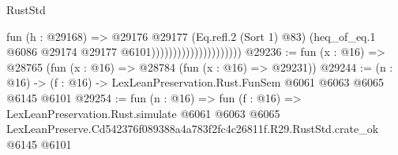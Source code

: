 \begin{lexlean}{RustStd}
\begin{coremodule}
                                          fun (h : @29168) =>
                                          @29176
                                            @29177
                                            (Eq.refl.{2} (Sort 1) @83)
                                            (heq_of_eq.{1}
                                              @6086
                                              @29174
                                              @29177
                                              @6101)))))))))))))))))))))
@29236 := fun (x : @16) => @28765 (fun (x : @16) => @28784 (fun (x : @16) => @29231))
@29244 := (n : @16) -> (f : @16) -> LexLeanPreservation.Rust.FunSem @6061 @6063 @6065 @6145 @6101
@29254 := fun (n : @16) =>
  fun (f : @16) =>
  LexLeanPreservation.Rust.simulate
    @6061
    @6063
    @6065
    LexLeanPreserve.Cd542376f089388a4a783f2fc4c26811f.R29.RustStd.crate_ok
    @6145
    @6101
\end{coremodule}
\end{lexlean}
